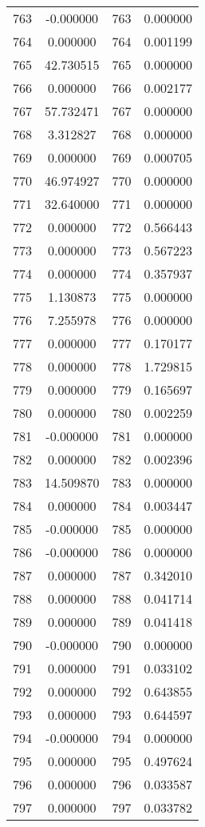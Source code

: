 \documentclass[12pt]{article}
\begin{document}
\begin{longtable}{@{}cccc@{}}
763 & -0.000000 & 763 & 0.000000 \\
764 & 0.000000 & 764 & 0.001199 \\
765 & 42.730515 & 765 & 0.000000 \\
766 & 0.000000 & 766 & 0.002177 \\
767 & 57.732471 & 767 & 0.000000 \\
768 & 3.312827 & 768 & 0.000000 \\
769 & 0.000000 & 769 & 0.000705 \\
770 & 46.974927 & 770 & 0.000000 \\
771 & 32.640000 & 771 & 0.000000 \\
772 & 0.000000 & 772 & 0.566443 \\
773 & 0.000000 & 773 & 0.567223 \\
774 & 0.000000 & 774 & 0.357937 \\
775 & 1.130873 & 775 & 0.000000 \\
776 & 7.255978 & 776 & 0.000000 \\
777 & 0.000000 & 777 & 0.170177 \\
778 & 0.000000 & 778 & 1.729815 \\
779 & 0.000000 & 779 & 0.165697 \\
780 & 0.000000 & 780 & 0.002259 \\
781 & -0.000000 & 781 & 0.000000 \\
782 & 0.000000 & 782 & 0.002396 \\
783 & 14.509870 & 783 & 0.000000 \\
784 & 0.000000 & 784 & 0.003447 \\
785 & -0.000000 & 785 & 0.000000 \\
786 & -0.000000 & 786 & 0.000000 \\
787 & 0.000000 & 787 & 0.342010 \\
788 & 0.000000 & 788 & 0.041714 \\
789 & 0.000000 & 789 & 0.041418 \\
790 & -0.000000 & 790 & 0.000000 \\
791 & 0.000000 & 791 & 0.033102 \\
792 & 0.000000 & 792 & 0.643855 \\
793 & 0.000000 & 793 & 0.644597 \\
794 & -0.000000 & 794 & 0.000000 \\
795 & 0.000000 & 795 & 0.497624 \\
796 & 0.000000 & 796 & 0.033587 \\
797 & 0.000000 & 797 & 0.033782 \\

\end{longtable}
\end{document}
